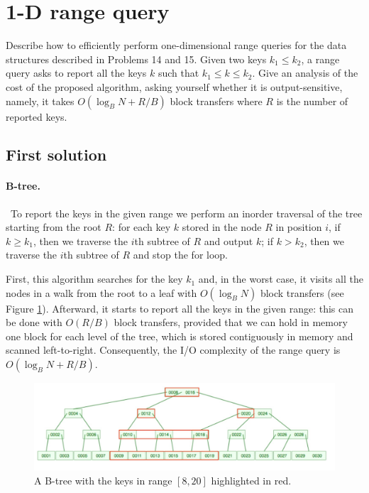 \section{1-D range query}
Describe how to efficiently perform one-dimensional range queries for the data structures described in Problems 14 and 15. Given two keys $k_1 \leq k_2$, a range query asks to report all the keys $k$ such that $k_1 \leq k \leq k_2$. Give an analysis of the cost of the proposed algorithm, asking yourself whether it is output-sensitive, namely, it takes $O(\log_B N + R/B)$ block transfers where $R$ is the number of reported keys.

\subsection{First solution}

\paragraph{B-tree.} To report the keys in the given range we perform an inorder traversal of the tree starting from the root $R$: for each key $k$ stored in the node $R$ in position $i$, if $k \geq k_1$, then we traverse the $i$th subtree of $R$ and output $k$; if $k > k_2$, then we traverse the $i$th subtree of $R$ and stop the for loop.
\begin{center}
\end{center}

First, this algorithm searches for the key $k_1$ and, in the worst case, it visits all the nodes in a walk from the root to a leaf with $O(\log_B N)$ block transfers (see Figure \ref{figure:btree-range}). Afterward, it starts to report all the keys in the given range: this can be done with $O(R/B)$ block transfers, provided that we can hold in memory one block for each level of the tree, which is stored contiguously in memory and scanned left-to-right. Consequently, the I/O complexity of the range query is $O(\log_B N + R/B)$.
\begin{figure}[h]
  \includegraphics[width=\linewidth]{images/btree-range}
  \caption{A B-tree with the keys in range $[8, 20]$ highlighted in red.}
  \label{figure:btree-range}
\end{figure}

